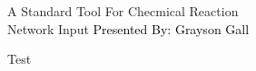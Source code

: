 \documentclass[aspectratio=169, 16pt]{beamer}
\begin{document}
%
%
{
\begin{frame}
  \centering
  \vspace{1.5cm}
	{\huge A Standard Tool For Checmical Reaction}\\
  \vspace{0.25cm}
  {\huge Network Input}
   \vbox{
    \vspace*{1.5cm}
    \textcolor{black}{\Large Presented By: Grayson Gall}
  }
\end{frame}
}

\begin{frame}{Test}
\end{frame}
\end{document}
